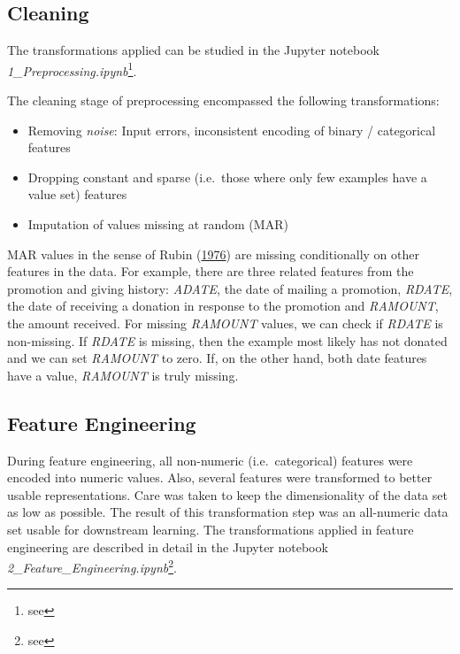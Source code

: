 \documentclass[
  11pt,
  a4paper,
  DIV=12,captions=tableheading,oneside,titlepage=firstiscover,abstracton]{scrreprt}
\providecommand{\tightlist}{%
  \setlength{\itemsep}{0pt}\setlength{\parskip}{0pt}}
\providecommand{\tightlist}{%
  \setlength{\itemsep}{0pt}\setlength{\parskip}{0pt}}
\begin{document}
\hypertarget{cleaning}{%
\subsection{Cleaning}\label{cleaning}}

The transformations applied can be studied in the Jupyter notebook \emph{1\_Preprocessing.ipynb}\footnote{see }.

The cleaning stage of preprocessing encompassed the following transformations:

\begin{itemize}
\tightlist
\item
  Removing \emph{noise}: Input errors, inconsistent encoding of binary / categorical features
\item
  Dropping constant and sparse (i.e.~those where only few examples have a value set) features
\item
  Imputation of values missing at random (MAR)
\end{itemize}

MAR values in the sense of Rubin (\protect\hyperlink{ref-rubin1976inference}{1976}) are missing conditionally on other features in the data. For example, there are three related features from the promotion and giving history: \emph{ADATE}, the date of mailing a promotion, \emph{RDATE}, the date of receiving a donation in response to the promotion and \emph{RAMOUNT}, the amount received. For missing \emph{RAMOUNT} values, we can check if \emph{RDATE} is non-missing. If \emph{RDATE} is missing, then the example most likely has not donated and we can set \emph{RAMOUNT} to zero. If, on the other hand, both date features have a value, \emph{RAMOUNT} is truly missing.

\hypertarget{methods-feature-engineering}{%
\subsection{Feature Engineering}\label{methods-feature-engineering}}

During feature engineering, all non-numeric (i.e.~categorical) features were encoded into numeric values. Also, several features were transformed to better usable representations. Care was taken to keep the dimensionality of the data set as low as possible. The result of this transformation step was an all-numeric data set usable for downstream learning. The transformations applied in feature engineering are described in detail in the Jupyter notebook \emph{2\_Feature\_Engineering.ipynb}\footnote{see }.
\end{document}
